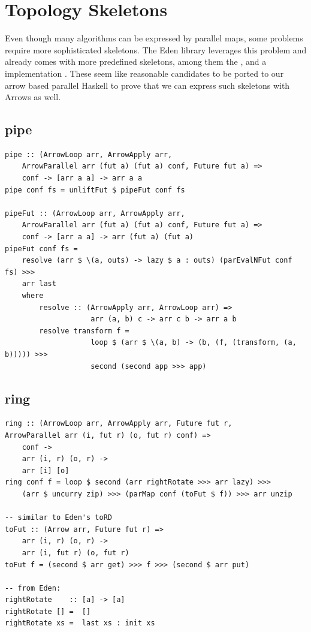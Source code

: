 \section{Topology Skeletons}
Even though many algorithms can be expressed by parallel maps, some problems require more sophisticated skeletons. The Eden library leverages this problem and already comes with more predefined skeletons, among them the ,  and a  implementation \cite{eden_cefp, eden_skel_topology}. These seem like reasonable candidates to be ported to our arrow based parallel Haskell to prove that we can express such skeletons with Arrows as well.

\subsection{pipe}

\begin{lstlisting}[frame=htrbl]
pipe :: (ArrowLoop arr, ArrowApply arr,
	ArrowParallel arr (fut a) (fut a) conf, Future fut a) =>
	conf -> [arr a a] -> arr a a
pipe conf fs = unliftFut $ pipeFut conf fs

pipeFut :: (ArrowLoop arr, ArrowApply arr,
	ArrowParallel arr (fut a) (fut a) conf, Future fut a) =>
	conf -> [arr a a] -> arr (fut a) (fut a)
pipeFut conf fs =
	resolve (arr $ \(a, outs) -> lazy $ a : outs) (parEvalNFut conf fs) >>>
	arr last
    where
        resolve :: (ArrowApply arr, ArrowLoop arr) =>
					arr (a, b) c -> arr c b -> arr a b
        resolve transform f =
					loop $ (arr $ \(a, b) -> (b, (f, (transform, (a, b))))) >>>
					second (second app >>> app)
\end{lstlisting}

\subsection{ring}

\begin{lstlisting}[frame=htrbl]
ring :: (ArrowLoop arr, ArrowApply arr, Future fut r, 
ArrowParallel arr (i, fut r) (o, fut r) conf) =>
	conf ->
	arr (i, r) (o, r) ->
	arr [i] [o]
ring conf f = loop $ second (arr rightRotate >>> arr lazy) >>>
	(arr $ uncurry zip) >>> (parMap conf (toFut $ f)) >>> arr unzip

-- similar to Eden's toRD
toFut :: (Arrow arr, Future fut r) =>
	arr (i, r) (o, r) ->
	arr (i, fut r) (o, fut r)
toFut f = (second $ arr get) >>> f >>> (second $ arr put)

-- from Eden:
rightRotate    :: [a] -> [a]
rightRotate [] =  []
rightRotate xs =  last xs : init xs
\end{lstlisting}

